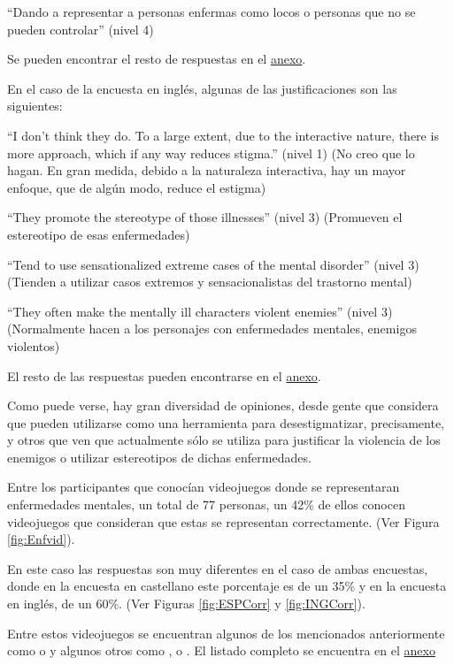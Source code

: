 \documentclass[12pt, a4paper,twoside,titlepage]{book}
\begin{document}
``Dando a representar a personas enfermas como locos o personas que no se pueden controlar'' (nivel 4) 

Se pueden encontrar el resto de respuestas en el \hyperref[estigmaCastellano]{anexo}.

En el caso de la encuesta en inglés, algunas de las justificaciones son las siguientes:

``I don't think they do. To a large extent, due to the interactive nature, there is more approach, which if any way reduces stigma.'' (nivel 1) (No creo que lo hagan. En gran medida, debido a la naturaleza interactiva, hay un mayor enfoque, que de algún modo, reduce el estigma)  

``They promote the stereotype of those illnesses'' (nivel 3) (Promueven el estereotipo de esas enfermedades)

``Tend to use sensationalized extreme cases of the mental disorder'' (nivel 3) (Tienden a utilizar casos extremos y sensacionalistas del trastorno mental)

``They often make the mentally ill characters violent enemies'' (nivel 3) (Normalmente hacen a los personajes con enfermedades mentales, enemigos violentos)

El resto de las respuestas pueden encontrarse en el \hyperref[estigmaIngles]{anexo}.

Como puede verse, hay gran diversidad de opiniones, desde gente que considera que pueden utilizarse como una herramienta para desestigmatizar, precisamente, y otros que ven que actualmente sólo se utiliza para justificar la violencia de los enemigos o utilizar estereotipos de dichas enfermedades. 

Entre los participantes que conocían videojuegos donde se representaran enfermedades mentales, un total de 77 personas, un 42\% de ellos conocen videojuegos que consideran que estas se representan correctamente. (Ver Figura \ref{fig:Enfvid}). 

En este caso las respuestas son muy diferentes en el caso de ambas encuestas, donde en la encuesta en castellano este porcentaje es de un 35\% y en la encuesta en inglés, de un 60\%. (Ver Figuras \ref{fig:ESPCorr} y \ref{fig:INGCorr}). 

 Entre estos videojuegos se encuentran algunos de los mencionados anteriormente como  o  y algunos otros como ,  o . El listado completo se encuentra en el \hyperref[listadoVidCorr]{anexo}\\ 
 
\end{document}

